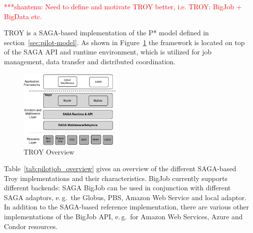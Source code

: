 \documentclass[conference,final]{IEEEtran}
\newcommand{\jhanote}[1]{ {\textcolor{red} { ***shantenu: #1 }}}
\newcommand{\jhanote}[1]{}
\begin{document}

\jhanote{Need to define and motivate TROY better, i.e. TROY: BigJob +
  BigData etc.}

TROY is a SAGA-based implementation of the P* model defined in 
section~\ref{sec:pilot-model}. As shown in Figure~\ref{fig:figures_troy} the 
framework is located on top of the SAGA API and runtime environment, which is 
utilized for job management, data transfer and distributed coordination.

\begin{figure}[htbp]
	\centering
		\includegraphics[width=0.45\textwidth]{figures/troy.pdf}
	\caption{TROY Overview}
	\label{fig:figures_troy}
\end{figure}


Table~\ref{tab:pilotjob_overview} gives an overview of the different SAGA-based 
Troy implementations and their characteristics. BigJob currently
supports different backends: SAGA BigJob can be used in conjunction
with different SAGA adaptors, e.\,g.\ the Globus, PBS, Amazon Web
Service and local adaptor. In addition to the SAGA-based reference
implementation, there are various other implementations of the BigJob
API, e.\,g.\ for Amazon Web Services, Azure and Condor resources.
\end{document}
